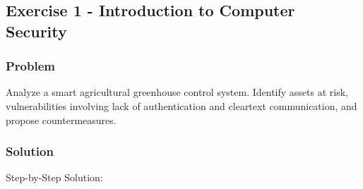 \documentclass{article}
\begin{document}
\subsection{Exercise 1 - Introduction to Computer Security}
\subsubsection*{Problem}
Analyze a smart agricultural greenhouse control system. Identify assets at risk, vulnerabilities involving lack of authentication and cleartext communication, and propose countermeasures.

\subsubsection*{Solution}
Step-by-Step Solution:
\end{document}
